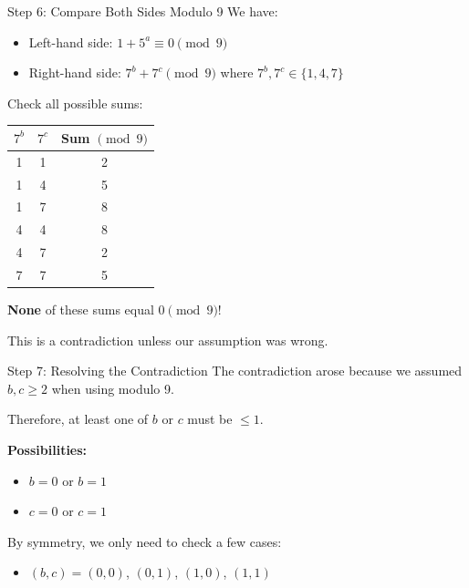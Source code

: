 ﻿\documentclass[10pt,aspectratio=169]{beamer}
\begin{document}
\begin{frame}{Step 6: Compare Both Sides Modulo 9}
    We have:
    \begin{itemize}
        \item Left-hand side: $1 + 5^a \equiv 0 \pmod 9$
        \item Right-hand side: $7^b + 7^c \pmod 9$ where $7^b, 7^c \in \{1,4,7\}$
    \end{itemize}
    
    Check all possible sums:
    \begin{center}
    \begin{tabular}{c|c|c}
        $7^b$ & $7^c$ & Sum $\pmod 9$ \\ \hline
        1 & 1 & 2 \\
        1 & 4 & 5 \\
        1 & 7 & 8 \\
        4 & 4 & 8 \\
        4 & 7 & 2 \\
        7 & 7 & 5
    \end{tabular}
    \end{center}
    
    \textbf{None} of these sums equal $0 \pmod 9$!
    
    This is a contradiction unless our assumption was wrong.
\end{frame}

\begin{frame}{Step 7: Resolving the Contradiction}
    The contradiction arose because we assumed $b,c \geq 2$ when using modulo 9.
    
    Therefore, at least one of $b$ or $c$ must be $\leq 1$.
    
    \textbf{Possibilities:}
    \begin{itemize}
        \item $b = 0$ or $b = 1$
        \item $c = 0$ or $c = 1$
    \end{itemize}
    
    By symmetry, we only need to check a few cases:
    \begin{itemize}
        \item $(b,c) = (0,0)$, $(0,1)$, $(1,0)$, $(1,1)$
    \end{itemize}
\end{frame}
\end{document}
